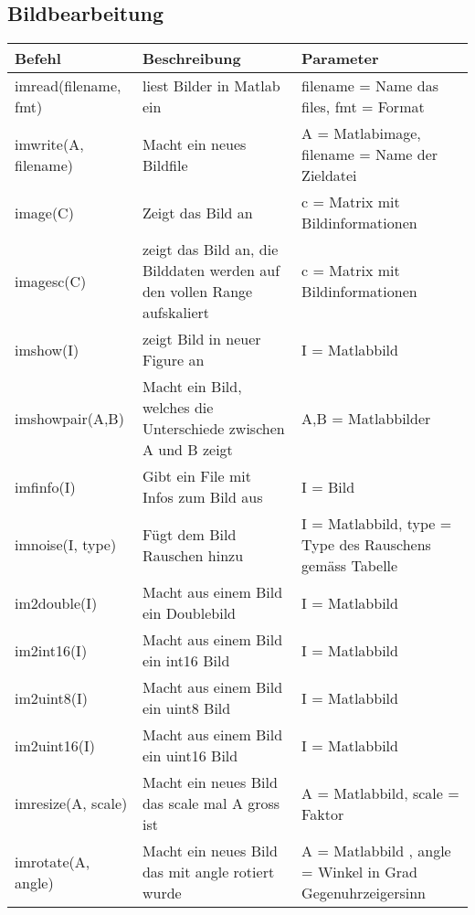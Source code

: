 \subsection{Bildbearbeitung}

\begin{minipage}{0.6\textwidth}
  \begin{tabular}{|p{2.5cm}| p{3.5cm}| p{4cm}|}
  \hline
  Befehl & Beschreibung & Parameter\\ \hline \hline
  imread(filename, fmt) & liest Bilder in Matlab ein& filename = Name das files, fmt = Format \\ \hline
  imwrite(A, filename)& Macht ein neues Bildfile & A = Matlabimage, filename = Name der Zieldatei\\ \hline
  image(C) & Zeigt das Bild an & c = Matrix mit Bildinformationen\\ \hline
  imagesc(C)& zeigt das Bild an, die Bilddaten werden auf den vollen Range aufskaliert & c = Matrix mit Bildinformationen \\ \hline
  imshow(I) & zeigt Bild in neuer Figure an & I = Matlabbild \\ \hline
  imshowpair(A,B)  & Macht ein Bild, welches die Unterschiede zwischen A und B zeigt & A,B = Matlabbilder \\ \hline
  imfinfo(I) & Gibt ein File mit Infos zum Bild aus & I = Bild \\ \hline
  imnoise(I, type)& Fügt dem Bild Rauschen hinzu & I = Matlabbild, type = Type des Rauschens gemäss Tabelle \\ \hline
  im2double(I) & Macht aus einem Bild ein Doublebild & I = Matlabbild \\ \hline
  im2int16(I) & Macht aus einem Bild ein int16 Bild & I = Matlabbild \\ \hline
  im2uint8(I) & Macht aus einem Bild ein uint8 Bild & I = Matlabbild \\ \hline
  im2uint16(I) & Macht aus einem Bild ein uint16 Bild & I = Matlabbild \\ \hline
  imresize(A, scale) & Macht ein neues Bild das scale mal A gross ist & A = Matlabbild, scale = Faktor \\ \hline
  imrotate(A, angle) & Macht ein neues Bild das mit angle rotiert wurde & A = Matlabbild , angle = Winkel in Grad Gegenuhrzeigersinn \\ \hline 
   
  
  
  \end{tabular}
\end{minipage}
